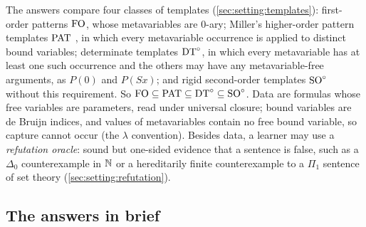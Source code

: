 The answers compare four classes of templates (\cref{sec:setting:templates}): first-order patterns $\mathrm{FO}$, whose
metavariables are $0$-ary; Miller's higher-order pattern templates $\mathrm{PAT}$ \citep{miller1991logic}, in which every
metavariable occurrence is applied to distinct bound variables; determinate templates $\mathrm{DT}^{\circ}$, in which every metavariable
has at least one such occurrence and the others may have any metavariable-free arguments, as $P(0)$ and $P(Sx)$; and
rigid second-order templates $\mathrm{SO}^{\circ}$ without this requirement. So $\mathrm{FO}\subseteq\mathrm{PAT}\subseteq\mathrm{DT}^{\circ}\subseteq\mathrm{SO}^{\circ}$. Data are
formulas whose free variables are parameters, read under universal closure; bound variables are de Bruijn indices, and
values of metavariables contain no free bound variable, so capture cannot occur (the $\lambda$ convention). Besides
data, a learner may use a \emph{refutation oracle}: sound but one-sided evidence that a sentence is false, such as a
$\Delta_0$ counterexample in $\mathbb{N}$ or a hereditarily finite counterexample to a $\Pi_1$ sentence of set theory
(\cref{sec:setting:refutation}).

\subsection{The answers in brief}\label{sec:intro:answers}

